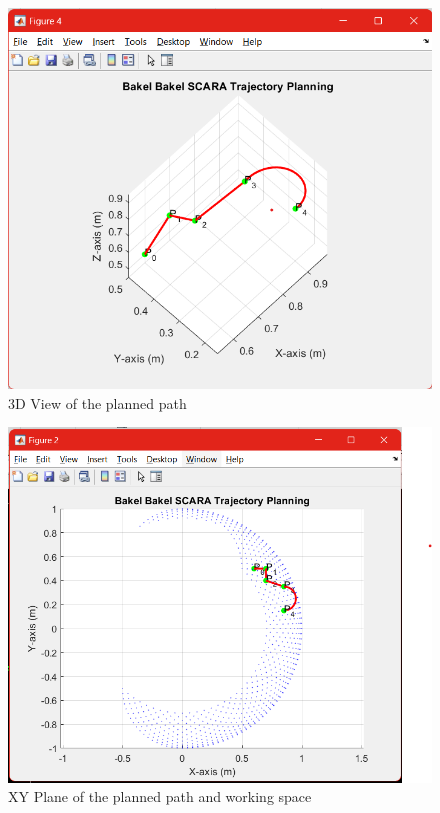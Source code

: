 \documentclass[12pt]{report}
\begin{document}
	\begin{figure}[H]
		\centering
		\includegraphics[scale=0.8]{T3} %
		\caption{3D View of the planned path}
		\label{run10} %
	\end{figure}
		\begin{figure}[H]
		\centering
		\includegraphics[scale=0.8]{PW1} %
		\caption{XY Plane of the planned path and working space}
		\label{run10} %
	\end{figure}
\end{document}

